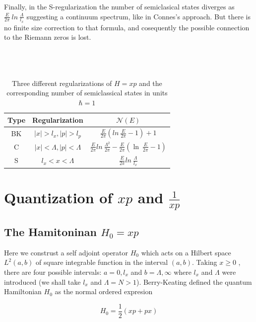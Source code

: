 \documentclass[12pt]{report}
\newcommand*{\1}{\hspace{1pt}}
\begin{document}
    Finally, in the S-regularization the number of semiclasical states diverges as $\frac{E}{2\pi} \ ln \ \frac{\Lambda}{l_{x}}$ suggesting a continuum spectrum, like in 
    Connes's approach. But there is no finite size correction to that formula, and cosequently the possible connection to the Riemann zeros is lost. \\ 
    \\ 
    \\


    \begin{longtable}[c]{c c c }
        \caption{\\Three different regularizations of $H=xp$ and the corresponding number of semiclassical states in units $\hbar=1$\cite{s7} }\\
        \hline
         Type & Regularization & $\mathcal{N}(E)$\\
         \hline 
         BK & $|x| > l_{x}, |p| > l_{p}$ & $\frac{E}{2\pi}\left(ln \ \frac{E}{2\pi}-1\right)+1$  \\  
         C & $|x| < \Lambda, |p| < \Lambda$ & $\frac{E}{2\pi}ln \ \frac{\Lambda^{2}}{2\pi} - \frac{E}{2\pi}\left(\ln \ \frac{E}{2\pi}-1\right)$   \\ 
         S & $l_{x} < x < \Lambda$ & $\frac{E}{2\pi}ln \ \frac{\Lambda}{l_{x}}$   \\ 
        \hline
    \end{longtable}

    \newpage
    \chapter{Quantization of $xp$ and $\frac{1}{xp}$}
    
    
    \section{The Hamitoninan $H_{0} = xp$}

        Here we construst a self adjoint operator $H_{0}$ which acts on a Hilbert space $L^{2}(a,b)$ of square integrable function in the interval $(a,b)$. Taking $x\geqslant 0$
        , there are four possible intervals: $a=0,l_{x}$ and $b=\Lambda, \infty $ where $l_{x}$ and $\Lambda$ were introduced (we shall take $l_{x}$ and $\Lambda = N > 1$).
        Berry-Keating defined the quantum Hamiltonian $H_{0}$ as the normal ordered expresion 

        \begin{equation}
            H_{0} = \frac{1}{2}(xp + px)
        \end{equation}
\end{document}
